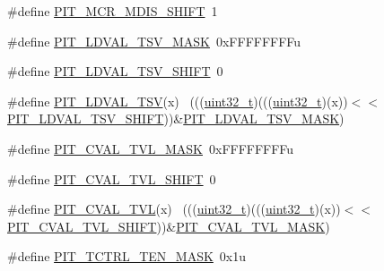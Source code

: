 \begin{DoxyCompactItemize}
\item 
\#define \hyperlink{group___p_i_t___register___masks_ga7ddcd16550ff71e4ee5ac48022ae6fb6}{P\+I\+T\+\_\+\+M\+C\+R\+\_\+\+M\+D\+I\+S\+\_\+\+S\+H\+I\+FT}~1
\item 
\#define \hyperlink{group___p_i_t___register___masks_gab7929b3b8a0c170a50f57d97face5365}{P\+I\+T\+\_\+\+L\+D\+V\+A\+L\+\_\+\+T\+S\+V\+\_\+\+M\+A\+SK}~0x\+F\+F\+F\+F\+F\+F\+F\+Fu
\item 
\#define \hyperlink{group___p_i_t___register___masks_ga463855d2b42de901bad9bea868f4f48b}{P\+I\+T\+\_\+\+L\+D\+V\+A\+L\+\_\+\+T\+S\+V\+\_\+\+S\+H\+I\+FT}~0
\item 
\#define \hyperlink{group___p_i_t___register___masks_gad83c6bcd6b67260c3f41755dcd2734e0}{P\+I\+T\+\_\+\+L\+D\+V\+A\+L\+\_\+\+T\+SV}(x)                                              ~(((\hyperlink{_p_e___types_8h_a33594304e786b158f3fb30289278f5af}{uint32\+\_\+t})(((\hyperlink{_p_e___types_8h_a33594304e786b158f3fb30289278f5af}{uint32\+\_\+t})(x))$<$$<$\hyperlink{group___p_i_t___register___masks_ga463855d2b42de901bad9bea868f4f48b}{P\+I\+T\+\_\+\+L\+D\+V\+A\+L\+\_\+\+T\+S\+V\+\_\+\+S\+H\+I\+FT}))\&\hyperlink{group___p_i_t___register___masks_gab7929b3b8a0c170a50f57d97face5365}{P\+I\+T\+\_\+\+L\+D\+V\+A\+L\+\_\+\+T\+S\+V\+\_\+\+M\+A\+SK})
\item 
\#define \hyperlink{group___p_i_t___register___masks_ga2810b877338372cb9b9d944b206c08d3}{P\+I\+T\+\_\+\+C\+V\+A\+L\+\_\+\+T\+V\+L\+\_\+\+M\+A\+SK}~0x\+F\+F\+F\+F\+F\+F\+F\+Fu
\item 
\#define \hyperlink{group___p_i_t___register___masks_ga28753a1a45034ccd34e052faa3e02ff0}{P\+I\+T\+\_\+\+C\+V\+A\+L\+\_\+\+T\+V\+L\+\_\+\+S\+H\+I\+FT}~0
\item 
\#define \hyperlink{group___p_i_t___register___masks_ga2fb557548a66d3bcc505e50f298bf1df}{P\+I\+T\+\_\+\+C\+V\+A\+L\+\_\+\+T\+VL}(x)                                                ~(((\hyperlink{_p_e___types_8h_a33594304e786b158f3fb30289278f5af}{uint32\+\_\+t})(((\hyperlink{_p_e___types_8h_a33594304e786b158f3fb30289278f5af}{uint32\+\_\+t})(x))$<$$<$\hyperlink{group___p_i_t___register___masks_ga28753a1a45034ccd34e052faa3e02ff0}{P\+I\+T\+\_\+\+C\+V\+A\+L\+\_\+\+T\+V\+L\+\_\+\+S\+H\+I\+FT}))\&\hyperlink{group___p_i_t___register___masks_ga2810b877338372cb9b9d944b206c08d3}{P\+I\+T\+\_\+\+C\+V\+A\+L\+\_\+\+T\+V\+L\+\_\+\+M\+A\+SK})
\item 
\#define \hyperlink{group___p_i_t___register___masks_ga1099670711f996f5fa84e33bbfe794b2}{P\+I\+T\+\_\+\+T\+C\+T\+R\+L\+\_\+\+T\+E\+N\+\_\+\+M\+A\+SK}~0x1u

\end{DoxyCompactItemize}
